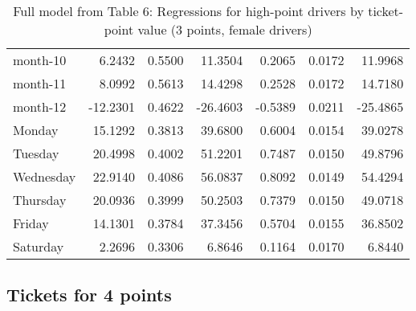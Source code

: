 \documentclass[10pt]{article}
\begin{document}
\begin{table}[ht]
\begin{tabular}{lrrrrrr}
  month-10 & 6.2432 & 0.5500 & 11.3504 & 0.2065 & 0.0172 & 11.9968 \\ 
  month-11 & 8.0992 & 0.5613 & 14.4298 & 0.2528 & 0.0172 & 14.7180 \\ 
  month-12 & -12.2301 & 0.4622 & -26.4603 & -0.5389 & 0.0211 & -25.4865 \\ 
  Monday & 15.1292 & 0.3813 & 39.6800 & 0.6004 & 0.0154 & 39.0278 \\ 
  Tuesday & 20.4998 & 0.4002 & 51.2201 & 0.7487 & 0.0150 & 49.8796 \\ 
  Wednesday & 22.9140 & 0.4086 & 56.0837 & 0.8092 & 0.0149 & 54.4294 \\ 
  Thursday & 20.0936 & 0.3999 & 50.2503 & 0.7379 & 0.0150 & 49.0718 \\ 
  Friday & 14.1301 & 0.3784 & 37.3456 & 0.5704 & 0.0155 & 36.8502 \\ 
  Saturday & 2.2696 & 0.3306 & 6.8646 & 0.1164 & 0.0170 & 6.8440 \\ 
   \hline
\end{tabular}
\caption{Full model from Table 6: Regressions for high-point drivers by ticket-point value (3 points, female drivers)} 
\label{tab_6_3_pts_no_age_F}
\end{table}


\clearpage
\pagebreak




\subsection{Tickets for 4 points}



\end{document}
